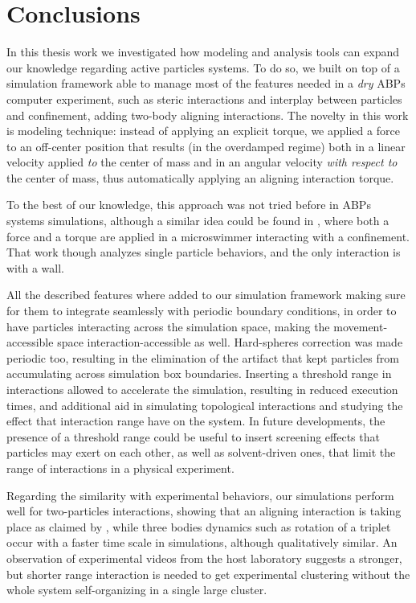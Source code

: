 \documentclass[../../master_thesis_np.tex]{subfiles}
\begin{document}
\chapter{Conclusions}

In this thesis work we investigated how modeling and analysis tools can expand our knowledge regarding active particles systems.
To do so, we built on top of a simulation framework able to manage most of the features needed in a \emph{dry} ABPs computer experiment, such as steric interactions and interplay between particles and confinement, adding two-body aligning interactions.
The novelty in this work is modeling technique: instead of applying an explicit torque, we applied a force to an off-center position that results (in the overdamped regime) both in a linear velocity applied \emph{to} the center of mass and in an angular velocity \emph{with respect to} the center of mass, thus automatically applying an aligning interaction torque.

To the best of our knowledge, this approach was not tried before in ABPs systems simulations, although a similar idea could be found in \cite{ostapenko_curvature-guided_2018}, where both a force and a torque are applied in a microswimmer interacting with a confinement.
That work though analyzes single particle behaviors, and the only interaction is with a wall.

All the described features where added to our simulation framework making sure for them to integrate seamlessly with periodic boundary conditions, in order to have particles interacting across the simulation space, making the movement-accessible space interaction-accessible as well.
Hard-spheres correction was made periodic too, resulting in the elimination of the artifact that kept particles from accumulating across simulation box boundaries.
Inserting a threshold range in interactions allowed to accelerate the simulation, resulting in reduced execution times, and additional aid in simulating topological interactions and studying the effect that interaction range have on the system.
In future developments, the presence of a threshold range could be useful to insert screening effects that particles may exert on each other, as well as solvent-driven ones, that limit the range of interactions in a physical experiment.

Regarding the similarity with experimental behaviors, our simulations perform well for two-particles interactions, showing that an aligning interaction is taking place as claimed by \cite{singh_pair_2024}, while three bodies dynamics such as rotation of a triplet occur with a faster time scale in simulations, although qualitatively similar.
An observation of experimental videos from the host laboratory suggests a stronger, but shorter range interaction is needed to get experimental clustering without the whole system self-organizing in a single large cluster.
\end{document}
